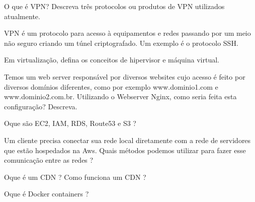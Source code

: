 \documentclass{ximera}
\begin{document}
\begin{example}
O que é VPN? Descreva três protocolos ou produtos de VPN utilizados atualmente.
\begin{explanation}
VPN é um protocolo para acesso à equipamentos e redes passando por um meio não seguro criando um túnel criptografado.
Um exemplo é o protocolo SSH.
\end{explanation}
\end{example}


\begin{example}
Em virtualização, defina os conceitos de hipervisor e máquina virtual.
\begin{explanation}
\end{explanation}
\end{example}


\begin{example}
Temos um web server responsável por diversos websites cujo acesso é feito por diversos domínios diferentes,
como por exemplo www.dominio1.com e www.dominio2.com.br. Utilizando  o Webserver Nginx, como seria feita esta configuração? Descreva.
\begin{explanation}
\end{explanation}
\end{example}


\begin{example}
Oque são EC2, IAM, RDS, Route53 e S3 ?
\begin{explanation}
\end{explanation}
\end{example}


\begin{example}
Um cliente precisa conectar sua rede local diretamente com a rede de servidores que estão hospedados na Aws. Quais métodos podemos utilizar para fazer esse comunicação entre as redes ?
\begin{explanation}
\end{explanation}
\end{example}


\begin{example}
Oque é um CDN ? Como funciona um CDN ?
\begin{explanation}
\end{explanation}
\end{example}


\begin{example}
Oque é Docker containers ?
\begin{explanation}
\end{explanation}
\end{example}
\end{document}
